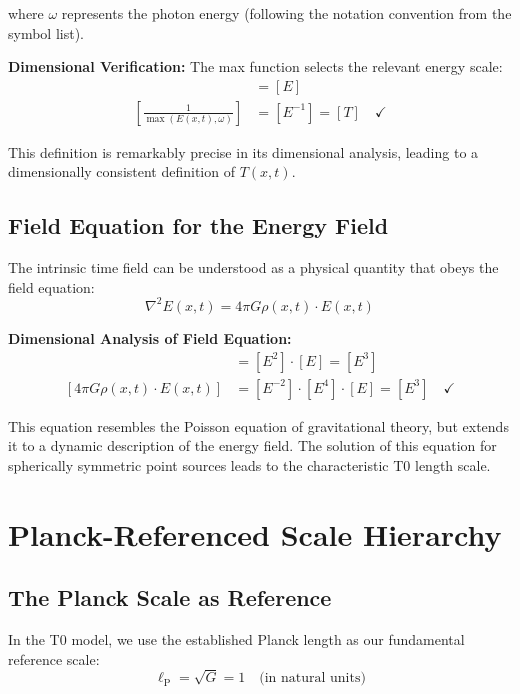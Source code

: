 \documentclass[12pt,a4paper]{report}
\newcommand{\lP}{\ell_{\text{P}}}         %
\begin{document}
	where $\omega$ represents the photon energy (following the notation convention from the symbol list).
	
	\textbf{Dimensional Verification:} The max function selects the relevant energy scale:
	\begin{align}
		[\max(E(x,t), \omega)] &= [E] \\
		\left[\frac{1}{\max(E(x,t), \omega)}\right] &= [E^{-1}] = [T] \quad \checkmark
	\end{align}
	
	This definition is remarkably precise in its dimensional analysis, leading to a dimensionally consistent definition of $T(x,t)$.
	
	\subsection{Field Equation for the Energy Field}\label{subsec:field_equation}
	
	The intrinsic time field can be understood as a physical quantity that obeys the field equation:
	\begin{equation}
		\nabla^2 E(x,t) = 4\pi G \rho(x,t) \cdot E(x,t)
		\label{eq:energy_field_equation}
	\end{equation}
	
	\textbf{Dimensional Analysis of Field Equation:}
	\begin{align}
		[\nabla^2 E(x,t)] &= [E^2] \cdot [E] = [E^3] \\
		[4\pi G \rho(x,t) \cdot E(x,t)] &= [E^{-2}] \cdot [E^4] \cdot [E] = [E^3] \quad \checkmark
	\end{align}
	
	This equation resembles the Poisson equation of gravitational theory, but extends it to a dynamic description of the energy field. The solution of this equation for spherically symmetric point sources leads to the characteristic T0 length scale.
	
	\section{Planck-Referenced Scale Hierarchy}\label{sec:planck_referenced_scales}
	
	\subsection{The Planck Scale as Reference}\label{subsec:planck_reference}
	
	In the T0 model, we use the established Planck length as our fundamental reference scale:
	\begin{equation}
		\boxed{\lP = \sqrt{G} = 1 \quad \text{(in natural units)}}
		\label{eq:planck_length_reference}
	\end{equation}
	
\end{document}
